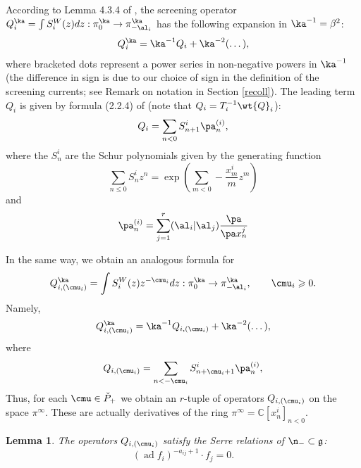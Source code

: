 \documentclass{amsart}
\newcommand{\on}{\operatorname}
\newcommand{\+}{\mathop{\oplus}}
\renewcommand{\*}{{\otimes}}
\newcommand{\mf}{\mathfrak}
\newcommand{\g}{\mf{g}}
\newcommand{\C}{\mathbb{C}}
\def\leq{\leqslant}
\def\geq{\geqslant}
\theoremstyle{theorem}
\newtheorem{Lem}[Th]{Lemma}
\theoremstyle{remark}
\numberwithin{equation}{section}
\begin{document}
According to Lemma 4.3.4 of \cite{FF93}, the screening operator
$Q_i^\ka = \int S^W_i(z) dz: \pi^\ka_0 \to \pi^\ka_{-\al_i}$ has the
following expansion in $\ka^{-1} = \beta^2$:
$$
Q_i^\ka = \ka^{-1} Q_i + \ka^{-2}(\dots),
$$
where bracketed dots represent a power series in non-negative powers
in $\ka^{-1}$ (the difference in sign is due to our choice of sign in
the definition of the screening currents; see Remark on notation in
Section \ref{recoll}). The leading term $Q_i$ is given by formula
(2.2.4) of \cite{FF93} (note that $Q_i = T_i^{-1} \wt{Q}_i$):
\begin{equation}    \label{Qi}
Q_i = \sum_{n<0} S^i_{n+1} \pa^{(i)}_n,
\end{equation}
where the $S^i_n$ are the Schur polynomials given by the generating
function
\begin{equation}    \label{Sin}
\sum_{n\leq 0} S^i_n z^n = \exp(\sum_{m<0} -\frac{x^i_m}{m} z^m)
\end{equation}
and
\begin{equation}    \label{pai}
\pa^{(i)}_n = \sum_{j=1}^r (\al_i|\al_j) \frac{\pa}{\pa
x^j_n}
\end{equation}

In the same way, we obtain an analogous formula for
$$
Q_{i,(\cmu_i)}^\ka = \int S^W_i(z) z^{-\cmu_i} dz: \pi^\ka_0 \to
\pi^\ka_{-\al_i}, \qquad \cmu_i\geq 0.
$$
Namely,
$$
Q_{i,(\cmu_i)}^\ka = \ka^{-1} Q_{i,(\cmu_i)} + \ka^{-2}(\dots),
$$
where
\begin{equation}    \label{Qim}
Q_{i,(\cmu_i)} = \sum_{n<-\cmu_i} S^i_{n+\cmu_i+1} \pa^{(i)}_n,
\end{equation}
Thus, for each $\cmu \in \check{P}_+$ we obtain an $r$-tuple of
operators $Q_{i,(\cmu_i)}$ on the space $\pi^\infty$. These are
actually derivatives of the ring $\pi^\infty = \C[x^i_n]_{n<0}$.

\begin{Lem}
The operators $Q_{i,(\cmu_i)}$ satisfy the Serre relations of $\n_-
\subset \g$:
\begin{equation}    \label{serre}
(\on{ad} f_i)^{-a_{ij}+1} \cdot f_j = 0.
\end{equation}
\end{Lem}
\end{document}
